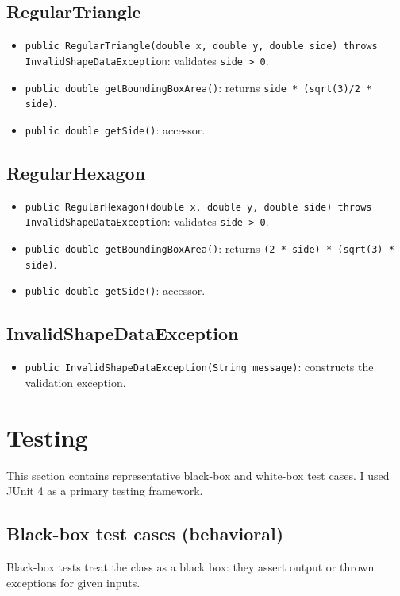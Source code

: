 \documentclass[a4paper,12pt]{article}
\begin{document}
\subsection{RegularTriangle}
\begin{itemize}
  \item \texttt{public RegularTriangle(double x, double y, double side) throws InvalidShapeDataException}: validates \texttt{side > 0}.
  \item \texttt{public double getBoundingBoxArea()}: returns \texttt{side * (sqrt(3)/2 * side)}.
  \item \texttt{public double getSide()}: accessor.
\end{itemize}

\subsection{RegularHexagon}
\begin{itemize}
  \item \texttt{public RegularHexagon(double x, double y, double side) throws InvalidShapeDataException}: validates \texttt{side > 0}.
  \item \texttt{public double getBoundingBoxArea()}: returns \texttt{(2 * side) * (sqrt(3) * side)}.
  \item \texttt{public double getSide()}: accessor.
\end{itemize}

\subsection{InvalidShapeDataException}
\begin{itemize}
  \item \texttt{public InvalidShapeDataException(String message)}: constructs the validation exception.
\end{itemize}

\newpage

\section{Testing}
This section contains representative black-box and white-box test cases. I used JUnit 4 as a primary testing framework.

\subsection{Black-box test cases (behavioral)}
Black-box tests treat the class as a black box: they assert output or thrown exceptions for given inputs.
\end{document}
